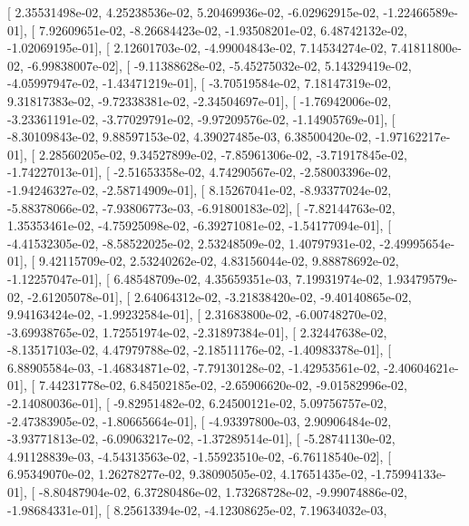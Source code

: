 \documentclass{article}
\begin{document}
       [  2.35531498e-02,   4.25238536e-02,   5.20469936e-02,
         -6.02962915e-02,  -1.22466589e-01],
       [  7.92609651e-02,  -8.26684423e-02,  -1.93508201e-02,
          6.48742132e-02,  -1.02069195e-01],
       [  2.12601703e-02,  -4.99004843e-02,   7.14534274e-02,
          7.41811800e-02,  -6.99838007e-02],
       [ -9.11388628e-02,  -5.45275032e-02,   5.14329419e-02,
         -4.05997947e-02,  -1.43471219e-01],
       [ -3.70519584e-02,   7.18147319e-02,   9.31817383e-02,
         -9.72338381e-02,  -2.34504697e-01],
       [ -1.76942006e-02,  -3.23361191e-02,  -3.77029791e-02,
         -9.97209576e-02,  -1.14905769e-01],
       [ -8.30109843e-02,   9.88597153e-02,   4.39027485e-03,
          6.38500420e-02,  -1.97162217e-01],
       [  2.28560205e-02,   9.34527899e-02,  -7.85961306e-02,
         -3.71917845e-02,  -1.74227013e-01],
       [ -2.51653358e-02,   4.74290567e-02,  -2.58003396e-02,
         -1.94246327e-02,  -2.58714909e-01],
       [  8.15267041e-02,  -8.93377024e-02,  -5.88378066e-02,
         -7.93806773e-03,  -6.91800183e-02],
       [ -7.82144763e-02,   1.35353461e-02,  -4.75925098e-02,
         -6.39271081e-02,  -1.54177094e-01],
       [ -4.41532305e-02,  -8.58522025e-02,   2.53248509e-02,
          1.40797931e-02,  -2.49995654e-01],
       [  9.42115709e-02,   2.53240262e-02,   4.83156044e-02,
          9.88878692e-02,  -1.12257047e-01],
       [  6.48548709e-02,   4.35659351e-03,   7.19931974e-02,
          1.93479579e-02,  -2.61205078e-01],
       [  2.64064312e-02,  -3.21838420e-02,  -9.40140865e-02,
          9.94163424e-02,  -1.99232584e-01],
       [  2.31683800e-02,  -6.00748270e-02,  -3.69938765e-02,
          1.72551974e-02,  -2.31897384e-01],
       [  2.32447638e-02,  -8.13517103e-02,   4.47979788e-02,
         -2.18511176e-02,  -1.40983378e-01],
       [  6.88905584e-03,  -1.46834871e-02,  -7.79130128e-02,
         -1.42953561e-02,  -2.40604621e-01],
       [  7.44231778e-02,   6.84502185e-02,  -2.65906620e-02,
         -9.01582996e-02,  -2.14080036e-01],
       [ -9.82951482e-02,   6.24500121e-02,   5.09756757e-02,
         -2.47383905e-02,  -1.80665664e-01],
       [ -4.93397800e-03,   2.90906484e-02,  -3.93771813e-02,
         -6.09063217e-02,  -1.37289514e-01],
       [ -5.28741130e-02,   4.91128839e-03,  -4.54313563e-02,
         -1.55923510e-02,  -6.76118540e-02],
       [  6.95349070e-02,   1.26278277e-02,   9.38090505e-02,
          4.17651435e-02,  -1.75994133e-01],
       [ -8.80487904e-02,   6.37280486e-02,   1.73268728e-02,
         -9.99074886e-02,  -1.98684331e-01],
       [  8.25613394e-02,  -4.12308625e-02,   7.19634032e-03,
\end{document}
